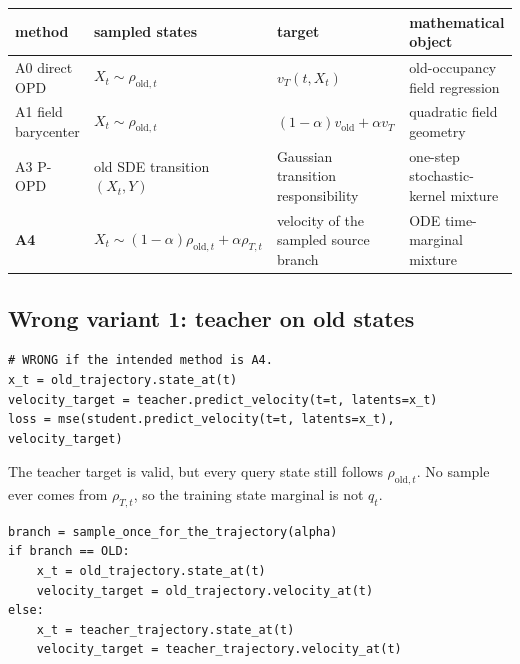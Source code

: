 \documentclass[11pt,a4paper]{article}
\newcommand{\vold}{v_{\mathrm{old}}}
\newcommand{\vT}{v_T}
\theoremstyle{plain}
\theoremstyle{definition}
\begin{document}
\begin{center}
\begin{tabular}{@{}
  >{\raggedright\arraybackslash}p{}
  >{\raggedright\arraybackslash}p{}
  >{\raggedright\arraybackslash}p{}
  >{\raggedright\arraybackslash}p{}
@{}}
\toprule
method & sampled states & target & mathematical object\\
\midrule
A0 direct OPD
& $X_t\sim\rho_{\mathrm{old},t}$
& $\vT(t,X_t)$
& old-occupancy field regression\\
\addlinespace
A1 field barycenter
& $X_t\sim\rho_{\mathrm{old},t}$
& $(1-\alpha)\vold+\alpha\vT$
& quadratic field geometry\\
\addlinespace
A3 P-OPD
& old SDE transition $(X_t,Y)$
& Gaussian transition responsibility
& one-step stochastic-kernel mixture\\
\addlinespace
\textbf{A4}
& $X_t\sim(1-\alpha)\rho_{\mathrm{old},t}+\alpha\rho_{T,t}$
& velocity of the sampled source branch
& ODE time-marginal mixture\\
\bottomrule
\end{tabular}
\end{center}

\subsection{Wrong variant 1: teacher on old states}

\begin{lstlisting}[style=badpython,caption={This is A0, not A4.}]
# WRONG if the intended method is A4.
x_t = old_trajectory.state_at(t)
velocity_target = teacher.predict_velocity(t=t, latents=x_t)
loss = mse(student.predict_velocity(t=t, latents=x_t), velocity_target)
\end{lstlisting}

The teacher target is valid, but every query state still follows $\rho_{\mathrm{old},t}$.
No sample ever comes from $\rho_{T,t}$, so the training state marginal is not $q_t$.

\begin{lstlisting}[style=goodpython,caption={The source branch controls both state and target.}]
branch = sample_once_for_the_trajectory(alpha)
if branch == OLD:
    x_t = old_trajectory.state_at(t)
    velocity_target = old_trajectory.velocity_at(t)
else:
    x_t = teacher_trajectory.state_at(t)
    velocity_target = teacher_trajectory.velocity_at(t)
\end{lstlisting}
\end{document}

